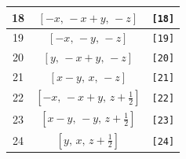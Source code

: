 \documentclass[fleqn,8pt]{jsarticle}
\begin{document}
\begin{longtable}{ccc}
18 & $\left[ - x,\, - x + y,\, - z \right]$ & {\tt [18]} \\ \hline
19 & $\left[ - x,\, - y,\, - z \right]$ & {\tt [19]} \\ \hline
20 & $\left[ y,\, - x + y,\, - z \right]$ & {\tt [20]} \\ \hline
21 & $\left[ x - y,\, x,\, - z \right]$ & {\tt [21]} \\ \hline
22 & $\left[ - x,\, - x + y,\, z + \frac{1}{2} \right]$ & {\tt [22]} \\ \hline
23 & $\left[ x - y,\, - y,\, z + \frac{1}{2} \right]$ & {\tt [23]} \\ \hline
24 & $\left[ y,\, x,\, z + \frac{1}{2} \right]$ & {\tt [24]} \\
\end{longtable}
\end{document}
